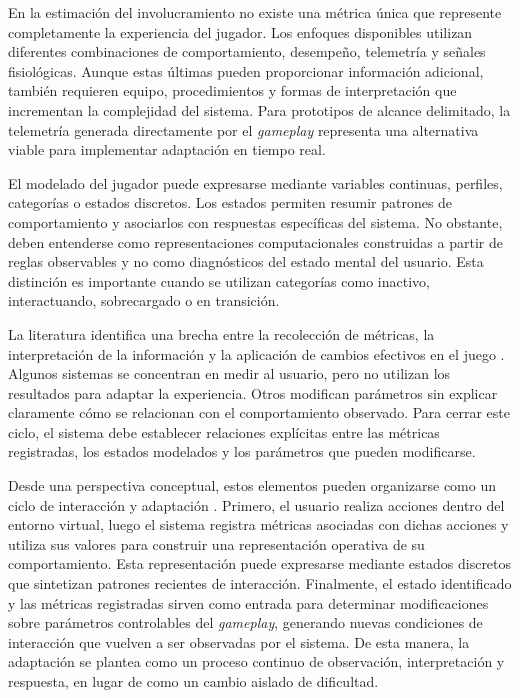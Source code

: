 En la estimación del involucramiento no existe una métrica única que 
represente completamente la experiencia del jugador. Los enfoques 
disponibles utilizan diferentes combinaciones de comportamiento, 
desempeño, telemetría y señales fisiológicas. Aunque estas últimas 
pueden proporcionar información adicional, también requieren equipo, 
procedimientos y formas de interpretación que incrementan la 
complejidad del sistema. Para prototipos de alcance delimitado, la 
telemetría generada directamente por el \textit{gameplay} representa 
una alternativa viable para implementar adaptación en tiempo real.

El modelado del jugador puede expresarse mediante variables continuas, 
perfiles, categorías o estados discretos. Los estados permiten resumir 
patrones de comportamiento y asociarlos con respuestas específicas del 
sistema. No obstante, deben entenderse como representaciones 
computacionales construidas a partir de reglas observables y no como 
diagnósticos del estado mental del usuario. Esta distinción es 
importante cuando se utilizan categorías como inactivo, interactuando, 
sobrecargado o en transición.

La literatura identifica una brecha entre la recolección de métricas, 
la interpretación de la información y la aplicación de cambios efectivos 
en el juego \cite{huber2021dda}. Algunos sistemas se concentran en medir 
al usuario, pero no utilizan los resultados para adaptar la experiencia. 
Otros modifican parámetros sin explicar claramente cómo se relacionan 
con el comportamiento observado. Para cerrar este ciclo, el sistema debe 
establecer relaciones explícitas entre las métricas registradas, los 
estados modelados y los parámetros que pueden modificarse.

Desde una perspectiva conceptual, estos elementos pueden organizarse 
como un ciclo de interacción y adaptación \cite{zohaib2018dda}. Primero, 
el usuario realiza acciones dentro del entorno virtual, luego el sistema 
registra métricas asociadas con dichas acciones y utiliza sus valores 
para construir una representación operativa de su comportamiento. Esta 
representación puede expresarse mediante estados discretos que 
sintetizan patrones recientes de interacción. Finalmente, el estado 
identificado y las métricas registradas sirven como entrada para 
determinar modificaciones sobre parámetros controlables del 
\textit{gameplay}, generando nuevas condiciones de interacción que 
vuelven a ser observadas por el sistema. De esta manera, la adaptación 
se plantea como un proceso continuo de observación, interpretación y 
respuesta, en lugar de como un cambio aislado de dificultad.

